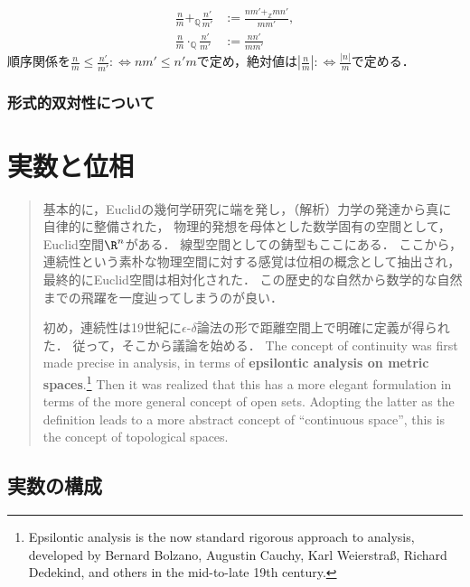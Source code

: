 \documentclass[uplatex,dvipdfmx]{jsreport}
\begin{document}
\begin{definition}
    \begin{align*}
        \frac{n}{m} +_\mathbb{Q} \frac{n'}{m'} &:= \frac{nm'+_\mathbb{Z}mn'}{mm'},\\
        \frac{n}{m}\cdot_\mathbb{Q}\frac{n'}{m'} &:= \frac{nn'}{mm'}
    \end{align*}
    順序関係を$\frac{n}{m}\le\frac{n'}{m'}:\Leftrightarrow nm'\le n'm$で定め，絶対値は$\left| \frac{n}{m} \right|:\Leftrightarrow \frac{|n|}{m}$で定める．
\end{definition}

\subsection{形式的双対性について}

\chapter{実数と位相}

\begin{quotation}
    基本的に，Euclidの幾何学研究に端を発し，（解析）力学の発達から真に自律的に整備された，
    物理的発想を母体とした数学固有の空間として，Euclid空間$\R^n$がある．
    線型空間としての鋳型もここにある．
    ここから，連続性という素朴な物理空間に対する感覚は位相の概念として抽出され，最終的にEuclid空間は相対化された．
    この歴史的な自然から数学的な自然までの飛躍を一度辿ってしまうのが良い．

    初め，連続性は19世紀に$\epsilon$-$\delta$論法の形で距離空間上で明確に定義が得られた．
    従って，そこから議論を始める．
    The concept of continuity was first made precise in analysis, in terms of \textbf{epsilontic analysis on metric spaces}.\footnote{Epsilontic analysis is the now standard rigorous approach to analysis, developed by Bernard Bolzano, Augustin Cauchy, Karl Weierstraß, Richard Dedekind, and others in the mid-to-late 19th century.}
    Then it was realized that this has a more elegant formulation in terms of the more general concept of open sets.
    Adopting the latter as the definition leads to a more abstract concept of “continuous space”, this is the concept of topological spaces.\cite{nLab}
\end{quotation}

\section{実数の構成}
\end{document}
